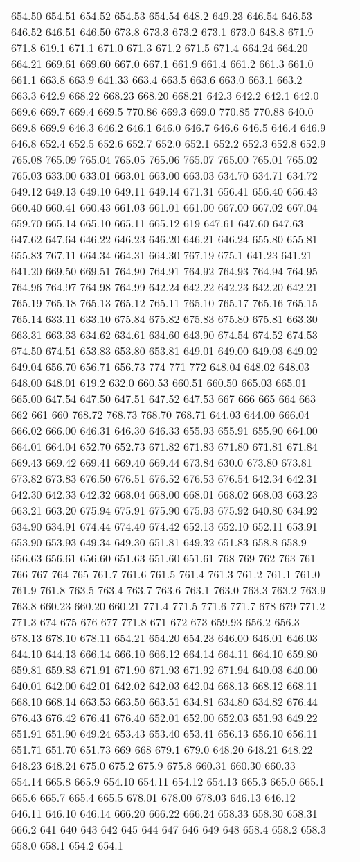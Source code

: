 \begin{longtable}{|R{.05in}|L{.5in}||L{5.75in}|}
654.50 654.51 654.52 654.53 654.54 648.2 649.23 646.54 646.53 646.52 646.51 646.50 673.8 673.3 673.2 673.1 673.0 648.8 671.9 671.8 619.1 671.1 671.0 671.3 671.2 671.5 671.4 664.24 664.20 664.21 669.61 669.60 667.0 667.1 661.9 661.4 661.2 661.3 661.0 661.1 663.8 663.9 641.33 663.4 663.5 663.6 663.0 663.1 663.2 663.3 642.9 668.22 668.23 668.20 668.21 642.3 642.2 642.1 642.0 669.6 669.7 669.4 669.5 770.86 669.3 669.0 770.85 770.88 640.0 669.8 669.9 646.3 646.2 646.1 646.0 646.7 646.6 646.5 646.4 646.9 646.8 652.4 652.5 652.6 652.7 652.0 652.1 652.2 652.3 652.8 652.9 765.08 765.09 765.04 765.05 765.06 765.07 765.00 765.01 765.02 765.03 633.00 633.01 663.01 663.00 663.03 634.70 634.71 634.72 649.12 649.13 649.10 649.11 649.14 671.31 656.41 656.40 656.43 660.40 660.41 660.43 661.03 661.01 661.00 667.00 667.02 667.04 659.70 665.14 665.10 665.11 665.12 619 647.61 647.60 647.63 647.62 647.64 646.22 646.23 646.20 646.21 646.24 655.80 655.81 655.83 767.11 664.34 664.31 664.30 767.19 675.1 641.23 641.21 641.20 669.50 669.51 764.90 764.91 764.92 764.93 764.94 764.95 764.96 764.97 764.98 764.99 642.24 642.22 642.23 642.20 642.21 765.19 765.18 765.13 765.12 765.11 765.10 765.17 765.16 765.15 765.14 633.11 633.10 675.84 675.82 675.83 675.80 675.81 663.30 663.31 663.33 634.62 634.61 634.60 643.90 674.54 674.52 674.53 674.50 674.51 653.83 653.80 653.81 649.01 649.00 649.03 649.02 649.04 656.70 656.71 656.73 774 771 772 648.04 648.02 648.03 648.00 648.01 619.2 632.0 660.53 660.51 660.50 665.03 665.01 665.00 647.54 647.50 647.51 647.52 647.53 667 666 665 664 663 662 661 660 768.72 768.73 768.70 768.71 644.03 644.00 666.04 666.02 666.00 646.31 646.30 646.33 655.93 655.91 655.90 664.00 664.01 664.04 652.70 652.73 671.82 671.83 671.80 671.81 671.84 669.43 669.42 669.41 669.40 669.44 673.84 630.0 673.80 673.81 673.82 673.83 676.50 676.51 676.52 676.53 676.54 642.34 642.31 642.30 642.33 642.32 668.04 668.00 668.01 668.02 668.03 663.23 663.21 663.20 675.94 675.91 675.90 675.93 675.92 640.80 634.92 634.90 634.91 674.44 674.40 674.42 652.13 652.10 652.11 653.91 653.90 653.93 649.34 649.30 651.81 649.32 651.83 658.8 658.9 656.63 656.61 656.60 651.63 651.60 651.61 768 769 762 763 761 766 767 764 765 761.7 761.6 761.5 761.4 761.3 761.2 761.1 761.0 761.9 761.8 763.5 763.4 763.7 763.6 763.1 763.0 763.3 763.2 763.9 763.8 660.23 660.20 660.21 771.4 771.5 771.6 771.7 678 679 771.2 771.3 674 675 676 677 771.8 671 672 673 659.93 656.2 656.3 678.13 678.10 678.11 654.21 654.20 654.23 646.00 646.01 646.03 644.10 644.13 666.14 666.10 666.12 664.14 664.11 664.10 659.80 659.81 659.83 671.91 671.90 671.93 671.92 671.94 640.03 640.00 640.01 642.00 642.01 642.02 642.03 642.04 668.13 668.12 668.11 668.10 668.14 663.53 663.50 663.51 634.81 634.80 634.82 676.44 676.43 676.42 676.41 676.40 652.01 652.00 652.03 651.93 649.22 651.91 651.90 649.24 653.43 653.40 653.41 656.13 656.10 656.11 651.71 651.70 651.73 669 668 679.1 679.0 648.20 648.21 648.22 648.23 648.24 675.0 675.2 675.9 675.8 660.31 660.30 660.33 654.14 665.8 665.9 654.10 654.11 654.12 654.13 665.3 665.0 665.1 665.6 665.7 665.4 665.5 678.01 678.00 678.03 646.13 646.12 646.11 646.10 646.14 666.20 666.22 666.24 658.33 658.30 658.31 666.2 641 640 643 642 645 644 647 646 649 648 658.4 658.2 658.3 658.0 658.1 654.2 654.1 
\end{longtable}
